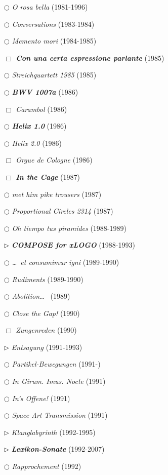 \documentclass[a4paper,12pt]{article}
\begin{document}
\begin{itemize}
\item[$\bigcirc$] \emph{O rosa bella} (1981-1996)
\item[$\bigcirc$] \emph{Conversations} (1983-1984)
\item[$\bigcirc$] \emph{Memento mori} (1984-1985)
\item[$\Box$] \textbf{\emph{Con una certa espressione parlante}} (1985)
\item[$\bigcirc$] \emph{Streichquartett 1985} (1985)
\item[$\bigcirc$] \textbf{\emph{BWV 1007a}} (1986)
\item[$\Box$] \emph{Carambol} (1986)
\item[$\bigcirc$] \textbf{\emph{Helix 1.0}} (1986)
\item[$\bigcirc$] \emph{Helix 2.0} (1986)
\item[$\Box$] \emph{Orgue de Cologne} (1986)
\item[$\Box$] \textbf{\emph{In the Cage}} (1987)
\item[$\bigcirc$] \emph{met him pike trousers} (1987)
\item[$\bigcirc$] \emph{Proportional Circles 2314} (1987)
\item[$\bigcirc$] \emph{Oh tiempo tus piramides} (1988-1989)
\item[$\rhd$] \textbf{\emph{COMPOSE for xLOGO}} (1988-1993)
\item[$\bigcirc$] \emph{\dots~et consumimur igni} (1989-1990)
\item[$\bigcirc$] \emph{Rudiments} (1989-1990)
\item[$\bigcirc$] \emph{Abolition\dots~} (1989)
\item[$\bigcirc$] \emph{Close the Gap!} (1990)
\item[$\Box$] \emph{Zungenreden} (1990)
\item[$\rhd$] \emph{Entsagung} (1991-1993)
\item[$\bigcirc$] \emph{Partikel-Bewegungen} (1991-)
\item[$\bigcirc$] \emph{In Girum. Imus. Nocte} (1991)
\item[$\bigcirc$] \emph{In's Offene!} (1991)
\item[$\bigcirc$] \emph{Space Art Transmission} (1991)
\item[$\rhd$] \emph{Klanglabyrinth} (1992-1995)
\item[$\rhd$] \textbf{\emph{Lexikon-Sonate}} (1992-2007)
\item[$\bigcirc$] \emph{Rapprochement} (1992)

\end{itemize}
\end{document}
